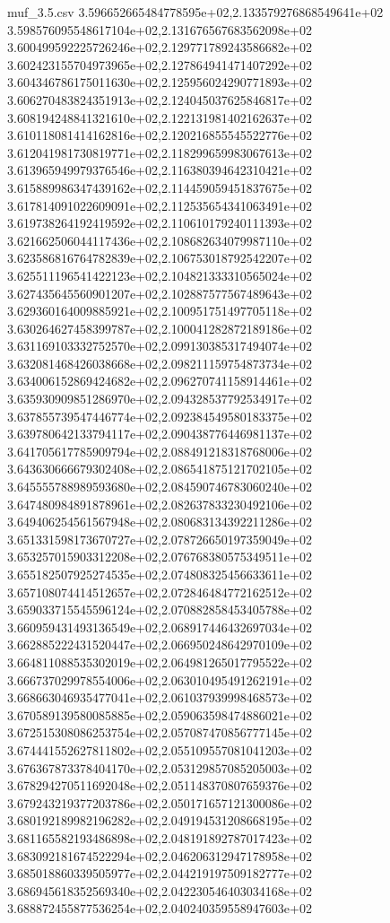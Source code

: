 \begin{filecontents*}{muf_3.5.csv}
3.596652665484778595e+02,2.133579276868549641e+02
3.598576095548617104e+02,2.131676567683562098e+02
3.600499592225726246e+02,2.129771789243586682e+02
3.602423155704973965e+02,2.127864941471407292e+02
3.604346786175011630e+02,2.125956024290771893e+02
3.606270483824351913e+02,2.124045037625846817e+02
3.608194248841321610e+02,2.122131981402162637e+02
3.610118081414162816e+02,2.120216855545522776e+02
3.612041981730819771e+02,2.118299659983067613e+02
3.613965949979376546e+02,2.116380394642310421e+02
3.615889986347439162e+02,2.114459059451837675e+02
3.617814091022609091e+02,2.112535654341063491e+02
3.619738264192419592e+02,2.110610179240111393e+02
3.621662506044117436e+02,2.108682634079987110e+02
3.623586816764782839e+02,2.106753018792542207e+02
3.625511196541422123e+02,2.104821333310565024e+02
3.627435645560901207e+02,2.102887577567489643e+02
3.629360164009885921e+02,2.100951751497705118e+02
3.630264627458399787e+02,2.100041282872189186e+02
3.631169103332752570e+02,2.099130385317494074e+02
3.632081468426038668e+02,2.098211159754873734e+02
3.634006152869424682e+02,2.096270741158914461e+02
3.635930909851286970e+02,2.094328537792534917e+02
3.637855739547446774e+02,2.092384549580183375e+02
3.639780642133794117e+02,2.090438776446981137e+02
3.641705617785909794e+02,2.088491218318768006e+02
3.643630666679302408e+02,2.086541875121702105e+02
3.645555788989593680e+02,2.084590746783060240e+02
3.647480984891878961e+02,2.082637833230492106e+02
3.649406254561567948e+02,2.080683134392211286e+02
3.651331598173670727e+02,2.078726650197359049e+02
3.653257015903312208e+02,2.076768380575349511e+02
3.655182507925274535e+02,2.074808325456633611e+02
3.657108074414512657e+02,2.072846484772162512e+02
3.659033715545596124e+02,2.070882858453405788e+02
3.660959431493136549e+02,2.068917446432697034e+02
3.662885222431520447e+02,2.066950248642970109e+02
3.664811088535302019e+02,2.064981265017795522e+02
3.666737029978554006e+02,2.063010495491262191e+02
3.668663046935477041e+02,2.061037939998468573e+02
3.670589139580085885e+02,2.059063598474886021e+02
3.672515308086253754e+02,2.057087470856777145e+02
3.674441552627811802e+02,2.055109557081041203e+02
3.676367873378404170e+02,2.053129857085205003e+02
3.678294270511692048e+02,2.051148370807659376e+02
3.679243219377203786e+02,2.050171657121300086e+02
3.680192189982196282e+02,2.049194531208668195e+02
3.681165582193486898e+02,2.048191892787017423e+02
3.683092181674522294e+02,2.046206312947178958e+02
3.685018860339505977e+02,2.044219197509182777e+02
3.686945618352569340e+02,2.042230546403034168e+02
3.688872455877536254e+02,2.040240359558947603e+02

\end{filecontents*}
